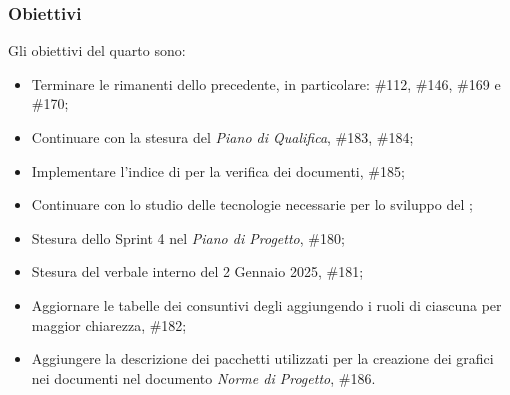 \subsubsection{Obiettivi}
Gli obiettivi del quarto  sono:
\begin{itemize}
    \item Terminare le  rimanenti dello  precedente, in particolare: \#112, \#146, \#169 e \#170;
    \item Continuare con la stesura del \textit{Piano di Qualifica},  \#183, \#184;
    \item Implementare l'indice di  per la verifica dei documenti,  \#185;
    \item Continuare con lo studio delle tecnologie necessarie per lo sviluppo del ;
    \item Stesura dello Sprint 4 nel \textit{Piano di Progetto},  \#180;
    \item Stesura del verbale interno del 2 Gennaio 2025,  \#181;
    \item Aggiornare le tabelle dei consuntivi degli  aggiungendo i ruoli di ciascuna  per maggior chiarezza,  \#182;
    \item Aggiungere la descrizione dei pacchetti utilizzati per la creazione dei grafici nei documenti nel documento \textit{Norme di Progetto},  \#186.
\end{itemize}
